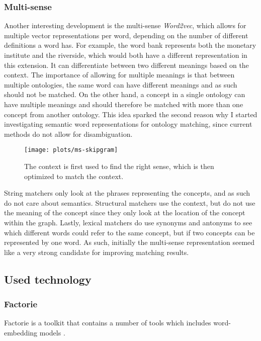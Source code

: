 \documentclass{article}
\begin{document}
 \subsubsection{Multi-sense} \label{multisense}
 Another interesting development is the multi-sense \emph{Word2vec}, which allows for multiple vector representations per word, depending on the number of different definitions a word has. For example, the word bank represents both the monetary institute and the riverside, which would both have a different representation in this extension. It can differentiate between two different meanings based on the context. The importance of allowing for multiple meanings is that between multiple ontologies, the same word can have different meanings and as such should not be matched. On the other hand, a concept in a single ontology can have multiple meanings and should therefore be matched with more than one concept from another ontology\cite{multisense}. This idea sparked the second reason why I started investigating semantic word representations for ontology matching, since current methods do not allow for disambiguation.

 \begin{figure}[H]
 \centering
 \texttt{[image: plots/ms-skipgram]}
 \caption[Multi-sense Skip-gram]{The context is first used to find the right sense, which is then optimized to match the context.}
 \label{ms-skipgram}
 \end{figure}

 String matchers only look at the phrases representing the concepts, and as such do not care about semantics. Structural matchers use the context, but do not use the meaning of the concept since they only look at the location of the concept within the graph. Lastly, lexical matchers do use synonyms and antonyms to see which different words could refer to the same concept, but if two concepts can be represented by one word. As such, initially the multi-sense representation seemed like a very strong candidate for improving matching results.
 
 \subsection{Used technology}
 \subsubsection{Factorie} \label{factorie}
 Factorie is a toolkit that contains a number of tools which includes word-embedding models \cite{git-factorie, w2v}.
\end{document}
